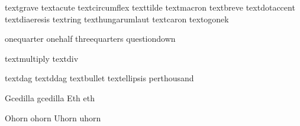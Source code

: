  textgrave        {}
 textacute        {}
 textcircumflex   {}
 texttilde        {}
 textmacron       {}
 textbreve        {}
 textdotaccent    {}
 textdiaeresis    {}
 textring         {}
 texthungarumlaut {}
 textcaron        {}
 textogonek       {}

 onequarter       {}
 onehalf          {}
 threequarters    {}
 questiondown     {}

 textmultiply     {}
 textdiv          {}

 textdag          {}
 textddag         {}
 textbullet       {}
 textellipsis     {}
 perthousand      {}

 Gcedilla         {}
 gcedilla         {}
 Eth              {}
 eth              {}

\stopencoding


\startencoding[uc]

   Ohorn                {}
   ohorn                {}
   Uhorn                {}
   uhorn                {}


